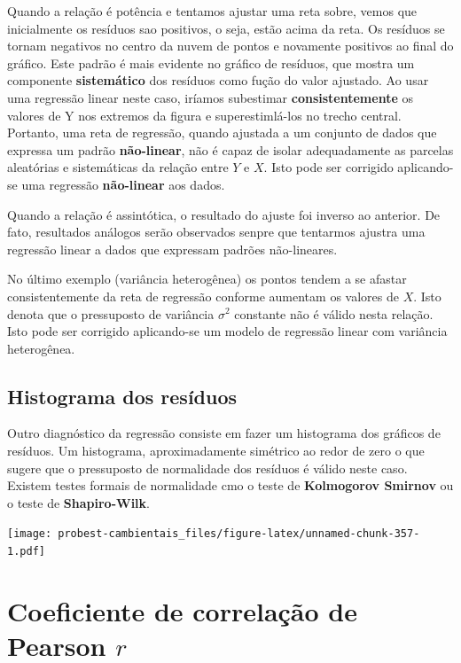 \documentclass[
]{book}
\begin{document}
Quando a relação é potência e tentamos ajustar uma reta sobre, vemos que inicialmente os resíduos sao positivos, o seja, estão acima da reta. Os resíduos se tornam negativos no centro da nuvem de pontos e novamente positivos ao final do gráfico. Este padrão é mais evidente no gráfico de resíduos, que mostra um componente \textbf{sistemático} dos resíduos como fução do valor ajustado. Ao usar uma regressão linear neste caso, iríamos subestimar \textbf{consistentemente} os valores de Y nos extremos da figura e superestimlá-los no trecho central. Portanto, uma reta de regressão, quando ajustada a um conjunto de dados que expressa um padrão \textbf{não-linear}, não é capaz de isolar adequadamente as parcelas aleatórias e sistemáticas da relação entre \(Y\) e \(X\). Isto pode ser corrigido aplicando-se uma regressão \textbf{não-linear} aos dados.

Quando a relação é assintótica, o resultado do ajuste foi inverso ao anterior. De fato, resultados análogos serão observados senpre que tentarmos ajustra uma regressão linear a dados que expressam padrões não-lineares.

No último exemplo (variância heterogênea) os pontos tendem a se afastar consistentemente da reta de regressão conforme aumentam os valores de \(X\). Isto denota que o pressuposto de variância \(\sigma^2\) constante não é válido nesta relação. Isto pode ser corrigido aplicando-se um modelo de regressão linear com variância heterogênea.

\hypertarget{histograma-dos-resuxedduos}{%
\subsection{Histograma dos resíduos}\label{histograma-dos-resuxedduos}}

Outro diagnóstico da regressão consiste em fazer um histograma dos gráficos de resíduos. Um histograma, aproximadamente simétrico ao redor de zero o que sugere que o pressuposto de normalidade dos resíduos é válido neste caso. Existem testes formais de normalidade cmo o teste de \textbf{Kolmogorov Smirnov} ou o teste de \textbf{Shapiro-Wilk}.

\texttt{[image: probest-cambientais\_files/figure-latex/unnamed-chunk-357-1.pdf]}

\hypertarget{coeficiente-de-correlauxe7uxe3o-de-pearson-r}{%
\section{\texorpdfstring{Coeficiente de correlação de Pearson \(r\)}{Coeficiente de correlação de Pearson r}}\label{coeficiente-de-correlauxe7uxe3o-de-pearson-r}}
\end{document}
